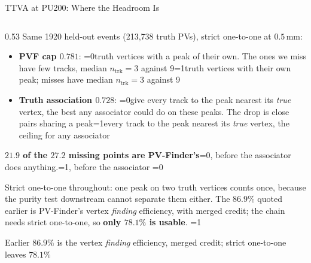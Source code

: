 \documentclass[xcolor=table,aspectratio=169]{beamer}
\newcommand{\ntrk}{\ensuremath{n_\mathrm{trk}}}
\providecommand{\talkbuild}{0}
\newcommand{\readingonly}[1]{\ifnum\talkbuild=0\relax#1\fi}
\newcommand{\talkonly}[1]{\ifnum\talkbuild=1\relax#1\fi}
\begin{document}
\begin{frame}{TTVA at PU200: Where the Headroom Is}
\begin{columns}[c]
\begin{column}{0.53\linewidth}
            Same 1920 held-out events (213{,}738 truth PVs), strict one-to-one at
            $0.5$\,mm:
            \begin{itemize}
                \setlength\itemsep{0.25em}
                \item \textbf{PVF cap $0.781$}: \readingonly{truth vertices with a peak of their
                    own. The ones we miss have few tracks, median \(\ntrk{=}3\)
                    against 9}\talkonly{truth vertices with their own peak; misses have
                    median \(\ntrk{=}3\) against 9}
                \item \textbf{Truth association $0.728$}: \readingonly{give every track to the peak
                    nearest its \emph{true} vertex, the best any associator could do on
                    these peaks. The drop is close pairs sharing a peak}\talkonly{every track to the
                    peak nearest its \emph{true} vertex, the ceiling for any associator}
            \end{itemize}
            \vspace{0.4em}
            \textcolor{pennred}{\textbf{$\mathbf{21.9}$ of the $\mathbf{27.2}$ missing
            points are PV-Finder's}}\readingonly{, before the associator does anything.}\talkonly{, before the associator}
            \readingonly{\vspace{0.3em}

            {\scriptsize\textcolor{black!55}{Strict one-to-one throughout: one peak on
            two truth vertices counts once, because the purity test downstream cannot
            separate them either. The $86.9\%$ quoted earlier is PV-Finder's vertex
            \emph{finding} efficiency, with merged credit; the chain needs strict
            one-to-one, so \textbf{only $78.1\%$ is usable}.}}}
            \talkonly{\vspace{0.3em}

            {\scriptsize\textcolor{black!55}{Earlier $86.9\%$ is the vertex
            \emph{finding} efficiency, merged credit; strict one-to-one leaves
            \textbf{$78.1\%$}}}}
        \end{column}
    \end{columns}
\end{frame}
\end{document}
